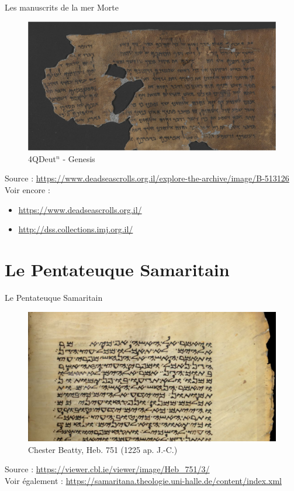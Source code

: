 \documentclass[11pt]{beamer}
\begin{document}
\begin{frame}{Les manuscrits de la mer Morte}
    \begin{figure}
        \centering
        \includegraphics[width=.9\linewidth]{img/4QDt_n.png}
        \caption{4QDeut${^n}$ - Genesis}
    \end{figure}
    \tiny{Source : \href{https://www.deadseascrolls.org.il/explore-the-archive/image/B-513126}{https://www.deadseascrolls.org.il/explore-the-archive/image/B-513126}\\
    Voir encore :\\
    \begin{itemize}
        \item \href{https://www.deadseascrolls.org.il/}{https://www.deadseascrolls.org.il/}       \item\href{http://dss.collections.imj.org.il/}{http://dss.collections.imj.org.il/}
    \end{itemize}
    }
\end{frame}

\section{Le Pentateuque Samaritain}

\begin{frame}{Le Pentateuque Samaritain}
    \begin{figure}
        \centering
        \includegraphics[width=1\linewidth]{img/chester_beatty_heb_751.png}
        \caption{Chester Beatty, Heb. 751 (1225 ap. J.-C.)}
    \end{figure}
    \tiny{Source : \href{https://viewer.cbl.ie/viewer/image/Heb_751/3/}{https://viewer.cbl.ie/viewer/image/Heb\_751/3/}\\
    Voir également : \href{https://samaritana.theologie.uni-halle.de/content/index.xml}{https://samaritana.theologie.uni-halle.de/content/index.xml}
    }
\end{frame}
\end{document}
